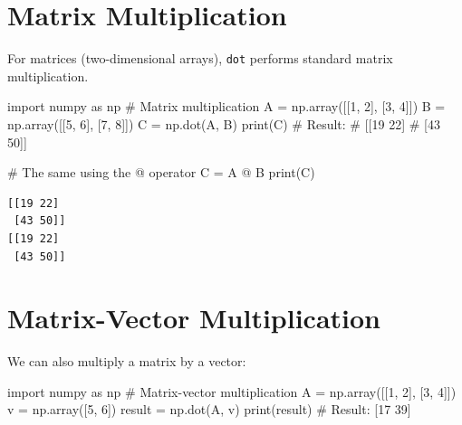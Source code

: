 \documentclass[
  english,
  letterpaper,
  DIV=11,
  numbers=noendperiod]{scrreprt}
\newenvironment{Shaded}{\begin{snugshade}}{\end{snugshade}}
\newcommand{\BuiltInTok}[1]{\textcolor[rgb]{0.00,0.23,0.31}{#1}}
\newcommand{\CommentTok}[1]{\textcolor[rgb]{0.37,0.37,0.37}{#1}}
\newcommand{\DecValTok}[1]{\textcolor[rgb]{0.68,0.00,0.00}{#1}}
\newcommand{\ImportTok}[1]{\textcolor[rgb]{0.00,0.46,0.62}{#1}}
\newcommand{\NormalTok}[1]{\textcolor[rgb]{0.00,0.23,0.31}{#1}}
\newcommand{\OperatorTok}[1]{\textcolor[rgb]{0.37,0.37,0.37}{#1}}
\begin{document}
\section{Matrix Multiplication}\label{matrix-multiplication}

For matrices (two-dimensional arrays), \texttt{dot} performs standard
matrix multiplication.

\begin{Shaded}
\begin{Highlighting}[]
\ImportTok{import}\NormalTok{ numpy }\ImportTok{as}\NormalTok{ np}
\CommentTok{\# Matrix multiplication}
\NormalTok{A }\OperatorTok{=}\NormalTok{ np.array([[}\DecValTok{1}\NormalTok{, }\DecValTok{2}\NormalTok{], [}\DecValTok{3}\NormalTok{, }\DecValTok{4}\NormalTok{]])}
\NormalTok{B }\OperatorTok{=}\NormalTok{ np.array([[}\DecValTok{5}\NormalTok{, }\DecValTok{6}\NormalTok{], [}\DecValTok{7}\NormalTok{, }\DecValTok{8}\NormalTok{]])}
\NormalTok{C }\OperatorTok{=}\NormalTok{ np.dot(A, B)}
\BuiltInTok{print}\NormalTok{(C)}
\CommentTok{\# Result:}
\CommentTok{\# [[19 22]}
\CommentTok{\#  [43 50]]}

\CommentTok{\# The same using the @ operator}
\NormalTok{C }\OperatorTok{=}\NormalTok{ A }\OperatorTok{@}\NormalTok{ B}
\BuiltInTok{print}\NormalTok{(C)}
\end{Highlighting}
\end{Shaded}

\begin{verbatim}
[[19 22]
 [43 50]]
[[19 22]
 [43 50]]
\end{verbatim}

\section{Matrix-Vector
Multiplication}\label{matrix-vector-multiplication}

We can also multiply a matrix by a vector:

\begin{Shaded}
\begin{Highlighting}[]
\ImportTok{import}\NormalTok{ numpy }\ImportTok{as}\NormalTok{ np}
\CommentTok{\# Matrix{-}vector multiplication}
\NormalTok{A }\OperatorTok{=}\NormalTok{ np.array([[}\DecValTok{1}\NormalTok{, }\DecValTok{2}\NormalTok{], [}\DecValTok{3}\NormalTok{, }\DecValTok{4}\NormalTok{]])}
\NormalTok{v }\OperatorTok{=}\NormalTok{ np.array([}\DecValTok{5}\NormalTok{, }\DecValTok{6}\NormalTok{])}
\NormalTok{result }\OperatorTok{=}\NormalTok{ np.dot(A, v)}
\BuiltInTok{print}\NormalTok{(result)  }\CommentTok{\# Result: [17 39]}
\end{Highlighting}
\end{Shaded}
\end{document}
